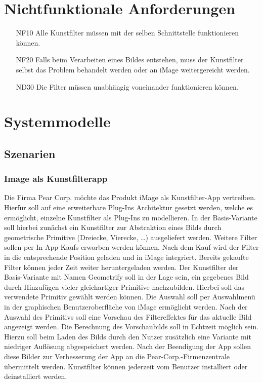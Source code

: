 \documentclass[parskip=full]{scrartcl}
\begin{document}
\section{Nichtfunktionale Anforderungen}
\begin{itemize}[nosep]
\item[NF10] Alle Kunstfilter müssen mit der selben \gls{Schnittstelle} funktionieren können.
\item[NF20] Falls beim Verarbeiten eines Bildes entstehen, muss der Kunstfilter selbst das Problem behandelt werden oder an iMage weitergereicht werden.
\item[ND30] Die Filter müssen unabhängig voneinander funktionieren können.
\end{itemize}

\section{Systemmodelle}

\subsection{Szenarien}
\subsubsection{Image als Kunstfilterapp}
%
%
Die Firma Pear Corp. möchte das Produkt iMage als Kunstfilter-App vertreiben. Hierfür soll auf eine erweiterbare \glspl{Plug-In} Architektur gesetzt werden, welche es ermöglicht, einzelne Kunstfilter als Plug-Ins zu modellieren. In der Basis-Variante soll hierbei zunächst ein Kunstfilter zur Abstraktion eines Bilds durch geometrische Primitive (Dreiecke, Vierecke, …) ausgeliefert werden. Weitere Filter sollen per \glspl{In-App-Kauf} erworben werden können. Nach dem Kauf wird der Filter in die entsprechende Position geladen und in iMage integriert. Bereits gekaufte Filter können jeder Zeit weiter heruntergeladen werden.
Der Kunstfilter der Basis-Variante mit Namen Geometrify soll in der Lage sein, ein gegebenes Bild durch Hinzufügen vieler gleichartiger Primitive nachzubilden. Hierbei soll das verwendete Primitiv gewählt werden können.
Die Auswahl soll per Auswahlmenü in der graphischen Benutzeroberfläche von iMage ermöglicht werden. Nach der Auswahl des Primitivs soll eine Vorschau des Filtereffektes für das aktuelle Bild angezeigt werden. Die Berechnung des Vorschaubilds soll in Echtzeit möglich sein. Hierzu soll beim Laden des Bilds durch den Nutzer zusätzlich eine Variante mit niedriger Auflösung abgespeichert werden. Nach der Beendigung der App sollen diese Bilder zur Verbesserung der App an die Pear-Corp.-Firmenzentrale übermittelt werden.
Kunstfilter können jederzeit vom Benutzer installiert oder deinstalliert werden.
\end{document}
